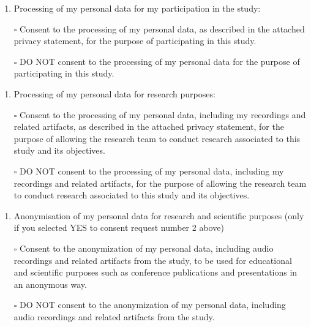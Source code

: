 \documentclass[
  12pt,
]{article}
\providecommand{\tightlist}{%
  \setlength{\itemsep}{0pt}\setlength{\parskip}{0pt}}
\begin{document}
\begin{enumerate}
\def\labelenumi{(\arabic{enumi})}
\tightlist
\item
  Processing of my personal data for my participation in the study:
\end{enumerate}

\begin{itemize}
\tightlist
\item[$\square$]
  Consent to the processing of my personal data, as described in the attached privacy statement, for the purpose of participating in this study.
\item[$\square$]
  DO NOT consent to the processing of my personal data for the purpose of participating in this study.
\end{itemize}

\begin{enumerate}
\def\labelenumi{(\arabic{enumi})}
\setcounter{enumi}{1}
\tightlist
\item
  Processing of my personal data for research purposes:
\end{enumerate}

\begin{itemize}
\tightlist
\item[$\square$]
  Consent to the processing of my personal data, including my recordings and related artifacts, as described in the attached privacy statement, for the purpose of allowing the research team to conduct research associated to this study and its objectives.
\item[$\square$]
  DO NOT consent to the processing of my personal data, including my recordings and related artifacts, for the purpose of allowing the research team to conduct research associated to this study and its objectives.
\end{itemize}

\begin{enumerate}
\def\labelenumi{(\arabic{enumi})}
\setcounter{enumi}{2}
\tightlist
\item
  Anonymisation of my personal data for research and scientific purposes (only if you selected YES to consent request number 2 above)
\end{enumerate}

\begin{itemize}
\tightlist
\item[$\square$]
  Consent to the anonymization of my personal data, including audio recordings and related artifacts from the study, to be used for educational and scientific purposes such as conference publications and presentations in an anonymous way.
\item[$\square$]
  DO NOT consent to the anonymization of my personal data, including audio recordings and related artifacts from the study.
\end{itemize}
\end{document}
